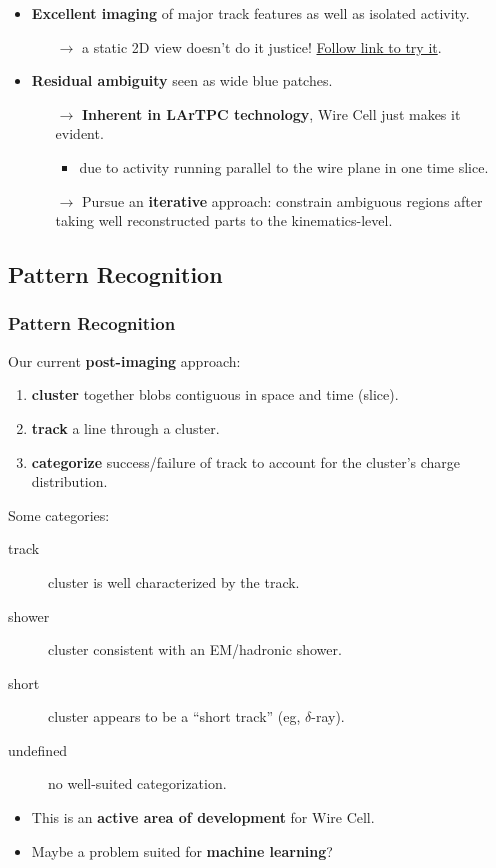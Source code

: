 \begin{frame}[fragile]
  \footnotesize
  \begin{itemize}
  \item \textbf{Excellent imaging} of major track features as well as isolated
    activity.
    \begin{itemize}\scriptsize
    \item[$\rightarrow$] a static 2D view doesn't do it justice!  \href{http://www.phy.bnl.gov/wire-cell/bee/set/6/event/0/}{Follow link to try it}.
    \end{itemize}
  \item \textbf{Residual ambiguity} seen as wide blue patches.
    \begin{itemize}\scriptsize
    \item[$\rightarrow$] \textbf{Inherent in LArTPC technology}, Wire Cell just makes it evident.
      \begin{itemize}\scriptsize
      \item due to activity running parallel to the wire plane in one time slice.
      \end{itemize}
    \item[$\rightarrow$] Pursue
      an \textbf{iterative} approach: constrain ambiguous regions
      after taking well reconstructed parts to the kinematics-level.
    \end{itemize}
  \end{itemize}
\end{frame}


\subsection{Pattern Recognition}

\begin{frame}
  \frametitle{Pattern Recognition}
  Our current \textbf{post-imaging} approach:
  \begin{enumerate}
  \item \textbf{cluster} together blobs contiguous in space and time
    (slice).
  \item \textbf{track} a line through a cluster.
  \item \textbf{categorize} success/failure of track to account for the
    cluster's charge distribution.
  \end{enumerate}
  Some categories:
  \begin{description}
  \item[track] cluster is well characterized by the track.
  \item[shower] cluster consistent with an EM/hadronic shower.
  \item[short] cluster appears to be a ``short track'' (eg, $\delta$-ray).
  \item[undefined] no well-suited categorization.
  \end{description}

  \begin{itemize}
  \item This is an \textbf{active area of development} for Wire Cell.
  \item Maybe a problem suited for \textbf{machine learning}? 
  \end{itemize}

\end{frame}
